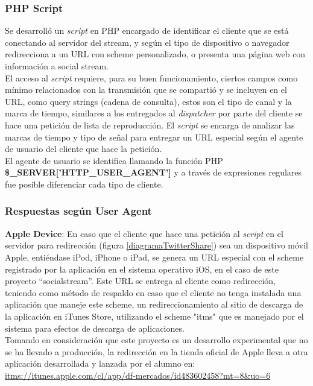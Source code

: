 		\subsubsection{PHP Script}
		\label{subsec:php-redir}
Se desarrolló un \textit{script} en PHP encargado de identificar el cliente que se está conectando al servidor del stream, y según el tipo de dispositivo o navegador redirecciona a un URL con scheme personalizado, o presenta una página web con información a social stream.\\

El acceso al \textit{script} requiere, para su buen funcionamiento, ciertos campos como mínimo relacionados con la transmisión que se compartió y se incluyen en el URL, como query strings (cadena de consulta), estos son el tipo de canal y la marca de tiempo, similares a los entregados al \textit{dispatcher} por parte del cliente se hace una petición de lista de reproducción.
El \textit{script} se encarga de analizar las marcas de tiempo y tipo de señal para entregar un URL especial según el agente de usuario del cliente que hace la petición.\\

El agente de usuario se identifica llamando la función PHP \textbf{\$\_SERVER['HTTP\_USER\_AGENT']} y a través de expresiones regulares fue posible diferenciar cada tipo de cliente.

		\subsubsection{Respuestas según User Agent}
\textbf{Apple Device}: En caso que el cliente que hace una petición al \textit{script} en el servidor para redirección (figura \ref{diagramaTwitterShare}) sea un dispositivo móvil Apple, entiéndase iPod, iPhone o iPad, se genera un URL especial con el scheme registrado por la aplicación en el sistema operativo iOS, en el caso de este proyecto \textquotedblleft socialstream\textquotedblright . Este URL se entrega al cliente como redirección, teniendo como método de respaldo en caso que el cliente no tenga instalada una aplicación que maneje este scheme, un redireccionamiento al sitio de descarga de la aplicación en iTunes Store, utilizando el scheme "itms" que es manejado por el sistema para efectos de descarga de aplicaciones. \\ 

Tomando en consideración que este proyecto es un desarrollo experimental que no se ha llevado a producción, la redirección en la tienda oficial de Apple lleva a otra aplicación desarrollada y lanzada por el alumno en: \url{itms://itunes.apple.com/cl/app/df-mercados/id483602458?mt=8\&uo=6} \\


